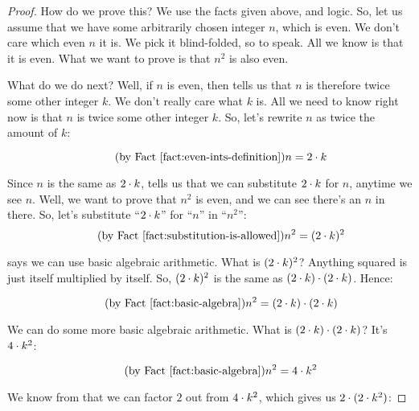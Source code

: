 \documentclass[../../../main.tex]{subfiles}
\begin{document}
\begin{proof}

How do we prove this? We use the facts given above, and logic. So, let us assume that we have some arbitrarily chosen integer $n$, which is even. We don't care which even $n$ it is. We pick it blind-folded, so to speak. All we know is that it is even. What we want to prove is that $n^{2}$ is also even. 

What do we do next? Well, if $n$ is even, then  tells us that $n$ is therefore twice some other integer $k$. We don't really care what $k$ is. All we need to know right now is that $n$ is twice some other integer $k$. So, let's rewrite $n$ as twice the amount of $k$:

\begin{equation*}
  \tag{by \factref{fact:even-ints-definition}}
  n = 2 \mult/ k
\end{equation*}

Since $n$ is the same as $2 \mult/ k$,  tells us that we can substitute $2 \mult/ k$ for $n$, anytime we see $n$. Well, we want to prove that $n^{2}$ is even, and we can see there's an $n$ in there. So, let's substitute ``$2 \mult/ k$'' for ``$n$'' in ``$n^{2}$'': 
\begin{equation*}
  \tag{by \factref{fact:substitution-is-allowed}}
  n^{2} = (2 \mult/ k)^{2}
\end{equation*}

 says we can use basic algebraic arithmetic. What is $(2 \mult/ k)^{2}$? Anything squared is just itself multiplied by itself. So, $(2 \mult/ k)^{2}$ is the same as $(2 \mult/ k) \mult/ (2 \mult/ k)$. Hence:

\begin{equation*}
  \tag{by \factref{fact:basic-algebra}}
  n^{2} = (2 \mult/ k) \mult/ (2 \mult/ k)
\end{equation*}

We can do some more basic algebraic arithmetic. What is $(2 \mult/ k) \mult/ (2 \mult/ k)$? It's $4 \mult/ k^{2}$:

\begin{equation*}
  \tag{by \factref{fact:basic-algebra}}
  n^{2} = 4 \mult/ k^{2}
\end{equation*}

We know from  that we can factor $2$ out from $4 \mult/ k^{2}$, which gives us $2 \mult/ (2 \mult/ k^{2})$:


\end{proof}
\end{document}
